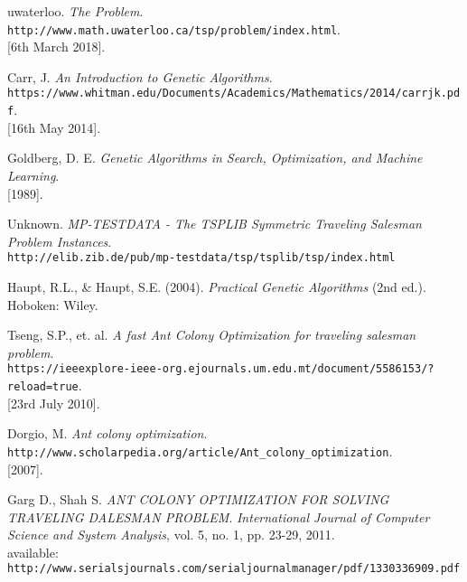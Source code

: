 \documentclass[11pt,a4paper,final]{article}
\begin{document}
	\pagebreak
	\begin{thebibliography}{9}
		uwaterloo.
		\textit{The Problem}.
		\\\texttt{http://www.math.uwaterloo.ca/tsp/problem/index.html}.
		\\{[6th March 2018]}.
		
		Carr, J.
		\textit{An Introduction to Genetic Algorithms}.
		\\\texttt{https://www.whitman.edu/Documents/Academics/Mathematics/2014/carrjk.pdf}.
		\\{[16th May 2014]}.
		
		Goldberg, D. E.
		\textit{Genetic Algorithms in Search, Optimization, and Machine
			Learning}.
		\\{[1989]}.
		
		Unknown.
		\textit{MP-TESTDATA - The TSPLIB Symmetric Traveling Salesman Problem Instances}.
		\\\texttt{http://elib.zib.de/pub/mp-testdata/tsp/tsplib/tsp/index.html}
		
		Haupt, R.L., \& Haupt, S.E. (2004).
		\textit{Practical Genetic Algorithms} (2nd ed.). Hoboken: Wiley.
		
		Tseng, S.P., et. al.
		\textit{A fast Ant Colony Optimization for traveling salesman problem}.
		\\\texttt{https://ieeexplore-ieee-org.ejournals.um.edu.mt/document/5586153/?reload=true}.
		\\{[23rd July 2010]}.
		
		Dorgio, M.
		\textit{Ant colony optimization}.
		\\\texttt{http://www.scholarpedia.org/article/Ant\_colony\_optimization}.
		\\{[2007]}.
		
		Garg D., Shah S.
		\textit{ANT COLONY OPTIMIZATION FOR SOLVING TRAVELING DALESMAN PROBLEM}.
		\textit{International Journal of Computer Science and System Analysis}, vol. 5, no. 1, pp. 23-29, 2011.\\
		available: \texttt{http://www.serialsjournals.com/serialjournalmanager/pdf/1330336909.pdf}
	\end{thebibliography}	
\end{document}
